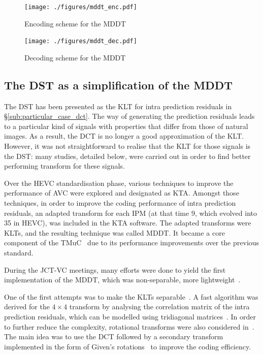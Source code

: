 \documentclass[11pt,a4paper,openright,twoside]{book}
\numberwithin{equation}{section} %
\numberwithin{figure}{section} %
\numberwithin{table}{section} %
\begin{document}
\begin{figure}[tp]
	\centering
	\texttt{[image: ./figures/mddt\_enc.pdf]}
	\caption{Encoding scheme for the \acs{MDDT}}
	\label{fig:mddt_enc}
\end{figure}

\begin{figure}[tp]
	\centering
	\texttt{[image: ./figures/mddt\_dec.pdf]}
	\caption{Decoding scheme for the \acs{MDDT}}
	\label{fig:mddt_dec}
\end{figure}

\subsection{The \acs{DST} as a simplification of the \acs{MDDT}}
\label{sub:dst_and_mddt}

The \ac{DST} has been presented as the \ac{KLT} for intra prediction residuals
in \S\ref{sub:particular_case_dct}.
The way of generating the prediction residuals leads to a particular kind of
signals with properties that differ from those of natural images.
As a result, the \ac{DCT} is no longer a good approximation of the \ac{KLT}.
However, it was not straightforward to realise that the \ac{KLT} for those
signals is the \ac{DST}:
many studies, detailed below, were carried out in order to find better
performing transform for these signals.

Over the \ac{HEVC} standardisation phase, various techniques to improve the
performance of \ac{AVC} were explored and designated as \ac{KTA}.
Amongst those techniques, in order to improve the coding performance of intra
prediction residuals, an adapted transform for each \ac{IPM} (at that time 9,
which evolved into 35 in \ac{HEVC}), was included in the \ac{KTA} software.
The adapted transforms were \acp{KLT}, and the resulting technique was called
\ac{MDDT}.
It became a core component of the \ac{TMuC}~\cite{JCTVC-A204} due to its
performance improvements over the previous standard.

During the \ac{JCT-VC} meetings, many efforts were done to yield the first
implementation of the \ac{MDDT}, which was non-separable, more
lightweight~\cite{VCEG-AG11}.

One of the first attempts was to make the \acp{KLT}
separable~\cite{JCTVC-B024}.
A fast algorithm was derived for the $4\times4$ transform by analysing
the correlation matrix of the intra prediction residuals, which can be
modelled using tridiagonal
matrices~\cite{yueh-05-eigenvalues-tridiagonal}.
In order to further reduce the complexity, rotational transforms were
also considered in~\cite{JCTVC-C096}.
The main idea was to use the \ac{DCT} followed by a secondary transform
implemented in the form of Given's
rotations~\cite{yang-04-matrix-decomposition} to improve the coding
efficiency.
\end{document}
